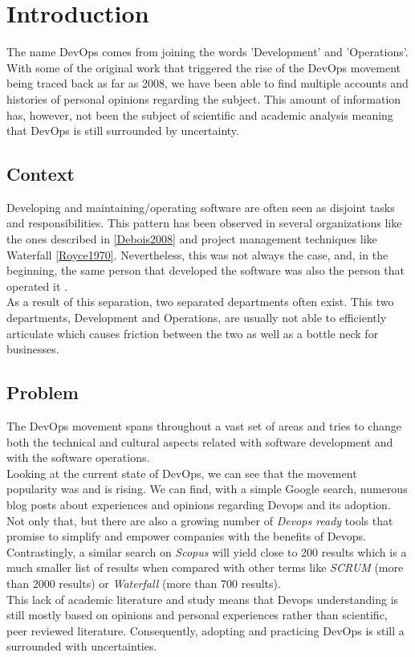 \chapter{Introduction} \label{chap:introduction}
The name DevOps comes from joining the words 'Development' and 'Operations'. With some of the original work that triggered the rise of the DevOps movement being traced back as far as 2008, we have been able to find multiple accounts and histories of personal opinions regarding the subject. This amount of information has, however, not been the subject of scientific and academic analysis meaning that DevOps is still surrounded by uncertainty.

		\section{Context} \label{chap:introduction:sec:context}
		Developing and maintaining/operating software are often seen as disjoint tasks and responsibilities. This pattern has been observed in several organizations like the ones described in \ref{Debois2008} and project management techniques like Waterfall \ref{Royce1970}. Nevertheless, this was not always the case, and, in the beginning, the same person that developed the software was also the person that operated it \cite{Loukides2012}.\\
		As a result of this separation, two separated departments often exist. This two departments, Development and Operations, are usually not able to efficiently articulate which causes friction between the two as well as a bottle neck for businesses.

		\section{Problem} \label{chap:introduction:sec:problem}

		The DevOps movement spans throughout a vast set of areas and tries to change both the technical and cultural aspects related with software development and with the software operations.\\
		Looking at the current state of DevOps, we can see that the movement popularity was and is rising. We can find, with a simple Google search, numerous blog posts about experiences and opinions regarding Devops and its adoption. Not only that, but there are also a growing number of \textit{Devops ready} tools that promise to simplify and empower companies with the benefits of Devops.\\
		Contrastingly, a similar search on \textit{Scopus} will yield close to 200 results which is a much smaller list of results when compared with other terms like \textit{SCRUM} (more than 2000 results) or \textit{Waterfall} (more than 700 results).\\
		This lack of academic literature and study means that Devops understanding is still mostly based on opinions and personal experiences rather than scientific, peer reviewed literature. Consequently, adopting and practicing DevOps is still a surrounded with uncertainties.

